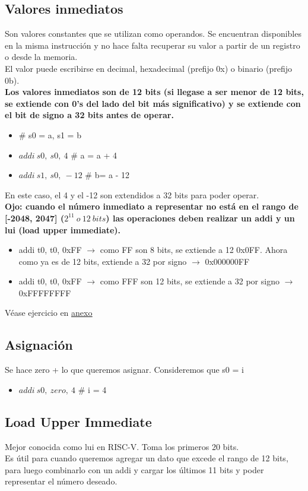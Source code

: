 \documentclass[10pt,a4paper]{article}
\begin{document}
\subsection*{Valores inmediatos}
Son valores constantes que se utilizan como operandos. Se encuentran disponibles en la misma instrucción y no hace falta recuperar su valor a partir de un registro o desde la memoria. \\
El valor puede escribirse en decimal, hexadecimal (prefijo 0x) o binario (prefijo 0b). \\
\textbf{Los valores inmediatos son de 12 bits (si llegase a ser menor de 12 bits, se extiende con 0's del lado del bit más significativo) y se extiende con el bit de signo a 32 bits antes de operar.}
\begin{itemize}
    \item \# s0 = a, s1 = b
    \item \(addi \ s0,\ s0,\ 4\) \# a = a + 4
    \item \(addi \ s1,\ s0, \ -12\) \# b= a - 12
\end{itemize}
En este caso, el 4 y el -12 son extendidos a 32 bits para poder operar. \\ 
\textbf{Ojo: cuando el número inmediato a representar no está en el rango de [-2048, 2047] ($2^{11} \ o \ 12 \ bits$) las operaciones deben realizar un addi y un lui (load upper immediate).} \\
\begin{itemize}
    \item addi t0, t0, 0xFF $ \rightarrow $ como FF son 8 bits, se extiende a 12 0x0FF. Ahora como ya es de 12 bits, extiende a 32 por signo $ \rightarrow $ 0x000000FF
    \item addi t0, t0, 0xFF $ \rightarrow $ como FFF son 12 bits, se extiende a 32 por signo $ \rightarrow $ 0xFFFFFFFF
\end{itemize}
Véase ejercicio en \hyperref[subsec:TPRVC]{\underline{anexo}}

\subsection*{Asignación}
Se hace zero + lo que queremos asignar. Consideremos que s0 = i
\begin{itemize}
    \item \(addi \ s0,\ zero,\ 4\) \# i = 4
\end{itemize}
\subsection*{Load Upper Immediate}
Mejor conocida como lui en RISC-V. Toma los primeros 20 bits. \\ 
Es útil para cuando queremos agregar un dato que excede el rango de 12 bits, para luego combinarlo con un addi y cargar los últimos 11 bits y poder representar el número deseado.
\end{document}
